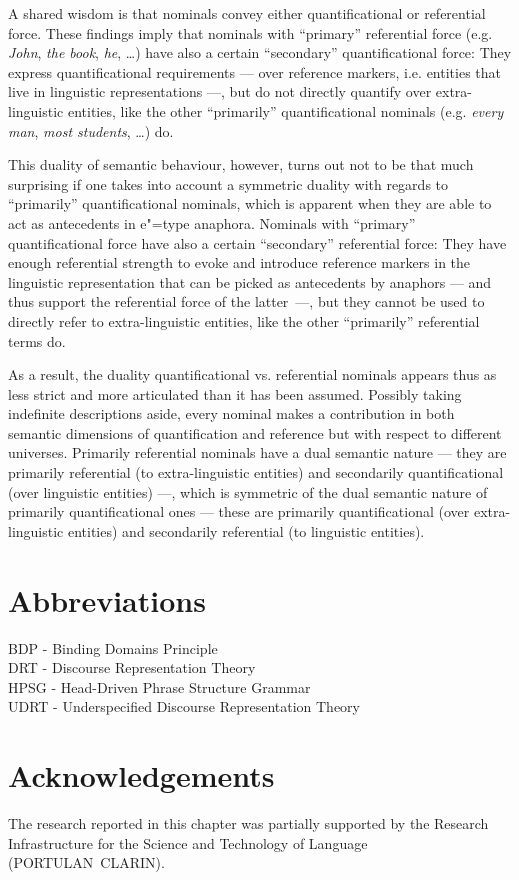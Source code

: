 \documentclass[output=paper
,modfonts
,nonflat]{langsci/langscibook}
\begin{document}
A shared wisdom is that nominals convey either quantificational or referential
force. These findings imply that nominals with ``primary'' referential force 
(e.g. \emph{John}, \emph{the book}, \emph{he}, \ldots) have also a certain ``secondary'' quantificational force: 
They express quantificational requirements --- over reference markers, i.e. entities that live in linguistic 
representations ---, but do not directly  quantify  over  extra-linguistic  
entities,  like  the  other  ``primarily'' quantificational nominals 
(e.g. \emph{every man}, \emph{most students}, \ldots) do.

This  duality  of  semantic  behaviour,  however,  turns  out  not  to  be  that  much
surprising  if  one  takes into account  a  symmetric  duality  with  regards  to  ``primarily'' quantificational
nominals, which is apparent when they are able to act as antecedents in e"=type anaphora. 
Nominals  with  ``primary''  quantificational 
force have also a certain ``secondary'' referential force: They
have enough referential strength to evoke and introduce reference markers in the
linguistic representation that can be picked as antecedents by anaphors --- and
thus support the referential force of the latter~---, but they cannot be used to directly refer 
to extra-linguistic entities, like the other ``primarily'' referential terms do.

As a result, the duality quantificational vs. referential nominals appears thus as less strict and more articulated 
than it has been assumed. Possibly
taking indefinite descriptions aside, every nominal makes a contribution in both semantic  dimensions  
of  quantification  and  reference  but  with  respect  to  different
universes. Primarily referential nominals have a dual semantic nature --- they are
primarily referential (to extra-linguistic entities) and secondarily quantificational 
(over linguistic entities) ---, which is symmetric of
the  dual semantic  nature  of  primarily  quantificational  ones --- these  are  primarily
quantificational (over extra-linguistic entities) and secondarily referential (to linguistic
entities).






\section*{Abbreviations}

BDP - Binding Domains Principle\\
DRT - Discourse Representation Theory\\
HPSG - Head-Driven Phrase Structure Grammar\\
UDRT - Underspecified Discourse Representation Theory

\section*{Acknowledgements}

The research reported in this chapter was partially supported by the 
Research Infrastructure  for  the Science  and  Technology of Language (\mbox{PORTULAN CLARIN}).

{\sloppy
\printbibliography[heading=subbibliography,notkeyword=this]
}
\end{document}
